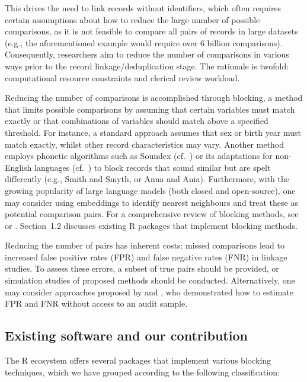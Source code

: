 This drives the need to link records without identifiers, which often
requires certain assumptions about how to reduce the large number of
possible comparisons, as it is not feasible to compare all pairs of
records in large datasets (e.g., the aforementioned example would
require over 6 billion comparisons). Consequently, researchers aim to
reduce the number of comparisons in various ways prior to the record
linkage/deduplication stage. The rationale is twofold: computational
resource constraints and clerical review workload.

Reducing the number of comparisons is accomplished through blocking, a
method that limits possible comparisons by assuming that certain
variables must match exactly or that combinations of variables should
match above a specified threshold. For instance, a standard approach
assumes that sex or birth year must match exactly, whilst other record
characteristics may vary. Another method employs phonetic algorithms
such as Soundex (cf.~\citet{Wright1960}) or its adaptations for non-English
languages (cf.~\citet{Phonetic2020}) to block records that sound similar but
are spelt differently (e.g., Smith and Smyth, or Anna and Ania).
Furthermore, with the growing popularity of large language models (both
closed and open-source), one may consider using embeddings
\citep{mikolov2013efficient} to identify nearest neighbours and treat these
as potential comparison pairs. For a comprehensive review of blocking
methods, see \citet{Steorts2014} or \citet{Papadakis2020}. Section~1.2 discusses
existing R packages that implement blocking methods.

Reducing the number of pairs has inherent costs: missed comparisons lead
to increased false positive rates (FPR) and false negative rates (FNR)
in linkage studies. To assess these errors, a subset of true pairs
should be provided, or simulation studies of proposed methods should be
conducted. Alternatively, one may consider approaches proposed by
\citet{dasylva2021estimating} and \citet{dasylva2022consistent}, who demonstrated how
to estimate FPR and FNR without access to an audit sample.

\subsection{Existing software and our contribution}\label{sec-software}

The R ecosystem offers several packages that implement various blocking
techniques, which we have grouped according to the following
classification:

